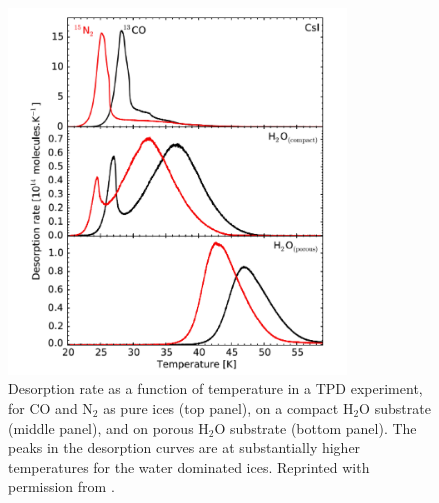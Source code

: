 \begin{figure}[t!]
\centering
\includegraphics[width=0.8\textwidth]{figures/fayolle.png}
\caption{Desorption rate as a function of temperature in a TPD experiment, for CO and N$_2$ as pure ices (top panel), on a compact H$_2$O substrate (middle panel), and on porous H$_2$O substrate (bottom panel). The peaks in the desorption curves are at substantially higher temperatures for the water dominated ices. Reprinted with permission from \citet{fayolle16}.}
\label{fig:fayolle}
\end{figure}





   


   

